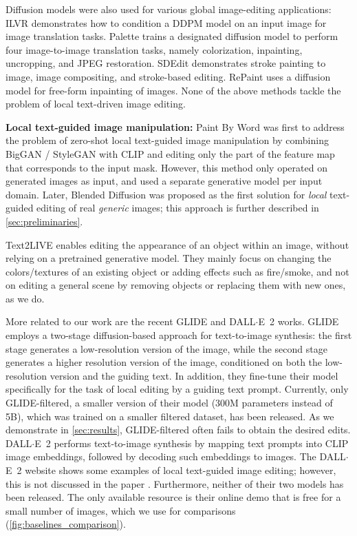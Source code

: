 Diffusion models were also used for various global image-editing applications: ILVR \cite{choi2021ilvr} demonstrates how to condition a DDPM model on an input image for image translation tasks. Palette \cite{saharia2022palette} trains a designated diffusion model to perform four image-to-image translation tasks, namely colorization, inpainting, uncropping, and JPEG restoration. SDEdit \cite{meng2021sdedit} demonstrates stroke painting to image, image compositing, and stroke-based editing. RePaint \cite{lugmayr2022repaint} uses a diffusion model for free-form inpainting of images. None of the above methods tackle the problem of local text-driven image editing.

\textbf{Local text-guided image manipulation:} Paint By Word \cite{bau2021paint} was first to address the problem of zero-shot local text-guided image manipulation by combining BigGAN / StyleGAN with CLIP and editing only the part of the feature map that corresponds to the input mask. However, this method only operated on generated images as input, and used a separate generative model per input domain. Later, Blended Diffusion \cite{avrahami2022blended} was proposed as the first solution for \emph{local} text-guided editing of real \emph{generic} images; this approach is further described in \ref{sec:preliminaries}.

Text2LIVE \cite{bar2022text2live} enables editing the appearance of an object within an image, without relying on a pretrained generative model. They mainly focus on changing the colors/textures of an existing object or adding effects such as fire/smoke, and not on editing a general scene by removing objects or replacing them with new ones, as we do.

More related to our work are the recent GLIDE \cite{nichol2021glide} and {DALL$\cdot$E}~2 \cite{ramesh2022hierarchical} works. GLIDE employs a two-stage diffusion-based approach for text-to-image synthesis: the first stage generates a low-resolution version of the image, while the second stage generates a higher resolution version of the image, conditioned on both the low-resolution version and the guiding text. In addition, they fine-tune their model specifically for the task of local editing by a guiding text prompt. Currently, only GLIDE-filtered, a smaller version of their model (300M parameters instead of 5B), which was trained on a smaller filtered dataset, has been released. As we demonstrate in \ref{sec:results}, GLIDE-filtered often fails to obtain the desired edits.
{DALL$\cdot$E}~2 performs text-to-image synthesis by mapping text prompts into CLIP image embeddings, followed by decoding such embeddings to images. The {DALL$\cdot$E}~2 website \cite{dalle2_website} shows some examples of local text-guided image editing; however, this is not discussed in the paper \cite{ramesh2022hierarchical}. Furthermore, neither of their two models has been released. The only available resource is their online demo \cite{dalle2_website} that is free for a small number of images, which we use for comparisons (\ref{fig:baselines_comparison}).

